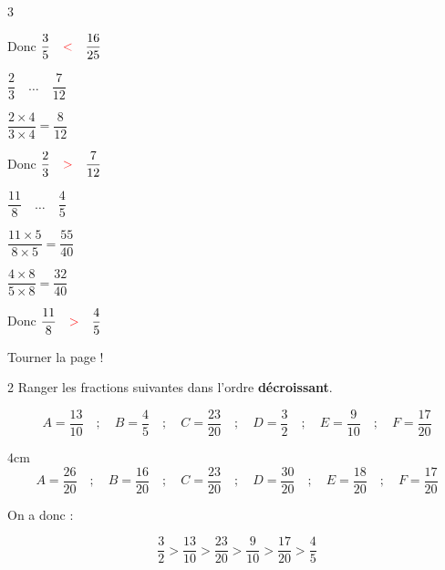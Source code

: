 \documentclass[a4paper]{book}
\begin{document}
{\begin{exerciceNote}{3}
\begin{minipage}{0.24\linewidth}
            \medskip

            Donc $\dfrac{3}{5} \quad \textcolor{red}{<} \quad \dfrac{16}{25}$
        \end{minipage}        
        \hfill\vline\hfill
        \begin{minipage}{0.24\linewidth}
            $\dfrac{2}{3} \quad \dots \quad \dfrac{7}{12}$
            
            \medskip

            $\dfrac{2\times4}{3\times4}=\dfrac{8}{12}$

            \medskip

            Donc $\dfrac{2}{3} \quad \textcolor{red}{>} \quad \dfrac{7}{12}$
        \end{minipage}
        \hfill\vline\hfill
        \begin{minipage}{0.24\linewidth}
            $\dfrac{11}{8} \quad \dots \quad \dfrac{4}{5}$
            
            \medskip

            $\dfrac{11\times5}{8\times5}=\dfrac{55}{40}$

            \medskip

            $\dfrac{4\times8}{5\times8}=\dfrac{32}{40}$
            
            \medskip

            Donc $\dfrac{11}{8} \quad \textcolor{red}{>} \quad \dfrac{4}{5}$
        \end{minipage}
    \end{exerciceNote}

\vfill
\hfill Tourner la page !


\newpage


    \begin{exerciceNote}{2}
        Ranger les fractions suivantes dans l'ordre \textbf{décroissant}.
            
        \[ A = \frac{13}{10} \quad ; \quad B = \frac{4}{5} \quad ; \quad C = \frac{23}{20} \quad ; \quad D = \frac{3}{2} \quad ; \quad E = \frac{9}{10} \quad ; \quad F = \frac{17}{20} \]
        
        \begin{ZoneReponse}{4cm}
            \[ A = \frac{26}{20} \quad ; \quad B = \frac{16}{20} \quad ; \quad C = \frac{23}{20} \quad ; \quad D = \frac{30}{20} \quad ; \quad E = \frac{18}{20} \quad ; \quad F = \frac{17}{20} \]

            On a donc :

            \[\dfrac{3}{2}>\dfrac{13}{10}>\dfrac{23}{20}>\dfrac{9}{10}>\dfrac{17}{20}>\dfrac{4}{5}\]
        \end{ZoneReponse}
    \end{exerciceNote}


}
\end{document}

